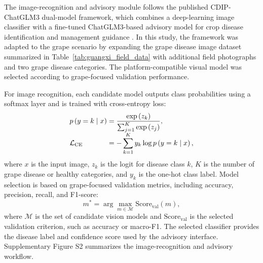 \documentclass[12pt]{article}
\begin{document}
The image-recognition and advisory module follows the published CDIP-ChatGLM3 dual-model framework, which combines a deep-learning image classifier with a fine-tuned ChatGLM3-based advisory model for crop disease identification and management guidance \citep{yanCDIPChatGLM3DualmodelApproach2025}. In this study, the framework was adapted to the grape scenario by expanding the grape disease image dataset summarized in Table~\ref{tab:guangxi_field_data} with additional field photographs and two grape disease categories. The platform-compatible visual model was selected according to grape-focused validation performance.

For image recognition, each candidate model outputs class probabilities using a softmax layer and is trained with cross-entropy loss:
\begin{equation}
\begin{array}{l@{\;}c@{\;}l}
\displaystyle p\left(y=k\mid x\right)
&=&
\displaystyle \frac{\exp\left(z_k\right)}
{\sum_{j=1}^{K}\exp\left(z_j\right)},\\[4pt]
\displaystyle \mathcal{L}_{\mathrm{CE}}
&=&
\displaystyle -\sum_{k=1}^{K}y_k
\log p\left(y=k\mid x\right),
\end{array}
\label{eq:softmax}
\end{equation}
where \(x\) is the input image, \(z_k\) is the logit for disease class \(k\), \(K\) is the number of grape disease or healthy categories, and \(y_k\) is the one-hot class label. Model selection is based on grape-focused validation metrics, including accuracy, precision, recall, and F1-score:
\begin{equation}
m^{*}
=
\arg\max_{m\in\mathcal{M}}
\mathrm{Score}_{\mathrm{val}}\left(m\right),
\label{eq:model_selection}
\end{equation}
where \(\mathcal{M}\) is the set of candidate vision models and \(\mathrm{Score}_{\mathrm{val}}\) is the selected validation criterion, such as accuracy or macro-F1. The selected classifier provides the disease label and confidence score used by the advisory interface. Supplementary Figure S2 summarizes the image-recognition and advisory workflow.
\end{document}
